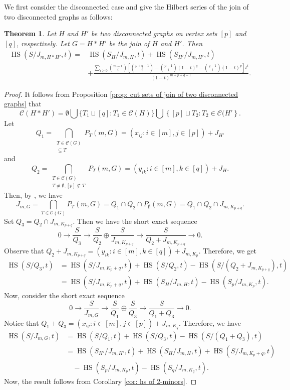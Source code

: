 \documentclass[12pt,reqno]{amsart}
\newcommand \hs{\operatorname{HS}}
\theoremstyle{plain}
\newtheorem{theorem}{Theorem}[section]
\theoremstyle{definition}
\begin{document}
We first consider the disconnected case and give the Hilbert series of the join of two disconnected graphs as follows:
\begin{theorem}\label{thm: hs of join of two disconnected graphs}
    Let $H$ and $H'$ be two disconnected graphs on vertex sets $[p]$ and $[q]$, respectively. Let $G=H*H'$ be the join of $H$ and $H'$. Then 
    \begin{align*}
        \hs(S/J_{m,H*H'},t)=&\hs(S_H/J_{m,H},t)+\hs(S_{H'}/J_{m,H'},t)\\
        & +\frac{\sum_{i\geq 0}\binom{m-1}{i}\left[\binom{p+q-1}{i}-\binom{p-1}{i}(1-t)^q-\binom{q-1}{i}(1-t)^p\right]t^i}{(1-t)^{m+p+q-1}}.
    \end{align*}
\end{theorem}
\begin{proof}
    It follows from Proposition \ref{prop: cut sets of join of two disconnected graphs} that 
    $$\mathscr C(H*H')=\emptyset \bigcup\{T_1\sqcup [q]:T_1\in \mathscr C(H)\}\bigcup \left\{[p]\sqcup T_2:T_2\in \mathscr C(H'\right\}.$$
    Let \[
Q_1=\bigcap_{\substack{T\in\mathscr{C}(G)\\ [p]\subseteq T}}P_T(m,G)=(x_{ij}:i\in[m],j\in [p])+J_{H'} 
\] and  \[
Q_2=\bigcap_{\substack{T\in\mathscr{C}(G)\\ T\neq\emptyset,[p]\not\subseteq T}}P_T(m,G)=(y_{ik}:i\in[m],k\in [q])+J_{H}. 
\]
Then, by \cite[Theorem 7]{GBI-Rauh-2013}, we have 
\[J_{m,G}=\bigcap_{T\in \mathscr{C}(G)}P_T(m,G)=Q_1\cap Q_2\cap P_{\emptyset}(m,G)=Q_1\cap Q_2\cap J_{m,K_{p+q}}.\]
Set $Q_3=Q_2\cap  J_{m,K_{p+q}}$. Then we have the short exact sequence 
\[ 0\rightarrow{\frac{S}{Q_3}}\rightarrow \frac{S}{Q_2}\oplus \frac{S}{J_{m,K_{p+q}}}\rightarrow \frac{S}{Q_2+J_{m,K_{p+q}}}\rightarrow 0.\]
Observe that $Q_2+J_{m,K_{p+q}}=(y_{ik}:i\in[m],k\in [q])+J_{m,K_p}.$ Therefore, we get
\begin{align*}
    \hs(S/{Q_3},t)&=\hs(S/{J_{m,K_p+q}},t)+\hs(S/{Q_2},t)-\hs(S/({Q_2+J_{m,K_{p+q}}}),t)\\
    &=\hs(S/{J_{m,K_p+q}},t)+\hs(S_H/{J_{m,H}},t)-\hs(S_p/{J_{m,K_{p}}},t).
\end{align*}
Now, consider the short exact sequence 
\[ 0\rightarrow{\frac{S}{J_{m,G}}}\rightarrow \frac{S}{Q_1}\oplus \frac{S}{Q_3}\rightarrow \frac{S}{Q_1+Q_3}\rightarrow 0.\]
Notice that $Q_1+Q_3=(x_{ij}:i\in[m],j\in [p])+J_{m,K_q}$. Therefore, we have
\begin{align*}
    \hs(S/J_{m,G},t)&=\hs(S/{Q_1},t)+\hs(S/{Q_3},t)-\hs(S/(Q_1+Q_3),t)\\
    &=\hs(S_{H'}/{J_{m,H'}},t)+\hs(S_H/{J_{m,H}},t)+\hs(S/{J_{m,K_p+q}},t)\\&\quad -\hs(S_p/{J_{m,K_{p}}},t)-\hs(S_q/{J_{m,K_{q}}},t).
\end{align*}
Now, the result follows from Corollary \ref{cor: hs of 2-minors}.
\end{proof}
\end{document}
